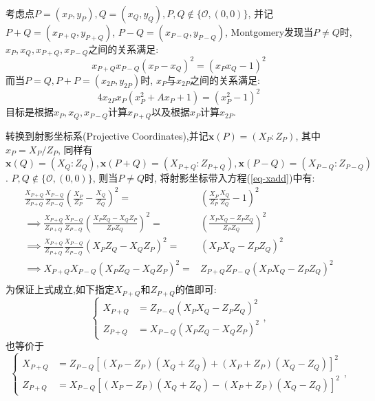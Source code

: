 考虑点$P=(x_P,y_P), Q = (x_Q, y_Q), P, Q \notin \{\mathcal{O}, (0,0)\}$,
并记$P+Q = (x_{P+Q}, y_{P+Q})$, $P-Q = (x_{P-Q}, y_{P-Q})$, Montgomery发现当$P\neq Q$时,
$x_P, x_Q, x_{P+Q}, x_{P-Q}$之间的关系满足:
\begin{equation}\label{eq-xadd}
x_{P+Q}x_{P-Q}(x_P - x_Q)^2 = (x_Px_Q - 1)^2
\end{equation}
而当$P=Q, P+P = (x_{2P}, y_{2P})$时, $x_P$与$x_{2P}$之间的关系满足:
\begin{equation}\label{eq-xdbl}
4x_{2P}x_P(x_P^2 + Ax_P + 1) = (x_P^2 - 1)^2
\end{equation}
目标是根据$x_P, x_Q, x_{P-Q}$计算$x_{P+Q}$以及根据$x_P$计算$x_{2P}$.

转换到射影坐标系(Projective Coordinates),并记$\mathbf{x}(P) = (X_P : Z_P)$, 其中$x_P = X_P/Z_P$,
同样有$\mathbf{x}(Q)=(X_Q : Z_Q), \mathbf{x}(P+Q) = (X_{P+Q} : Z_{P+Q}), 
\mathbf{x}(P-Q) = (X_{P-Q} : Z_{P-Q})$. $P, Q \notin \{\mathcal{O}, (0,0)\}$, 则当$P\neq Q$时,
将射影坐标带入方程(\ref{eq-xadd})中有:
\begin{equation*}
\begin{array}{rl}
\frac{X_{P+Q}}{Z_{P+Q}}\frac{X_{P-Q}}{Z_{P-Q}}\left(\frac{X_{P}}{Z_{P}}  - \frac{X_{Q}}{Z_{Q}}\right)^2 = & \left(\frac{X_{P}}{Z_{P}}\frac{X_{Q}}{Z_{Q}} -1\right)^2 \\
\implies \frac{X_{P+Q}}{Z_{P+Q}}\frac{X_{P-Q}}{Z_{P-Q}}\left(\frac{X_PZ_Q - X_QZ_P}{Z_PZ_Q}\right)^2 = & \left(\frac{X_PX_Q - Z_PZ_Q}{Z_PZ_Q}\right)^2 \\
\implies \frac{X_{P+Q}}{Z_{P+Q}}\frac{X_{P-Q}}{Z_{P-Q}}\left(X_PZ_Q - X_QZ_P\right)^2 = & \left(X_PX_Q - Z_PZ_Q\right)^2 \\
\implies X_{P+Q}X_{P-Q}\left(X_PZ_Q - X_QZ_P\right)^2 = & Z_{P+Q}Z_{P-Q}\left(X_PX_Q - Z_PZ_Q\right)^2 \\
\end{array}
\end{equation*}
为保证上式成立,如下指定$X_{P+Q}$和$Z_{P+Q}$的值即可:
\begin{equation*}
\left\{
\begin{array}{ll}
X_{P+Q} & = Z_{P-Q}\left(X_PX_Q - Z_PZ_Q\right)^2\\
Z_{P+Q} & = X_{P-Q}\left(X_PZ_Q - X_QZ_P\right)^2
\end{array},
\right.
\end{equation*}
也等价于
\begin{equation}\label{eq-xadd2}
\left\{
\begin{array}{ll}
X_{P+Q} & = Z_{P-Q}\left[ (X_P-Z_P)(X_Q+Z_Q) + (X_P+Z_P)(X_Q-Z_Q)  \right]^2\\
Z_{P+Q} & = X_{P-Q}\left[ (X_P-Z_P)(X_Q+Z_Q) - (X_P + Z_P)(X_Q-Z_Q)  \right]^2
\end{array},
\right.
\end{equation}

